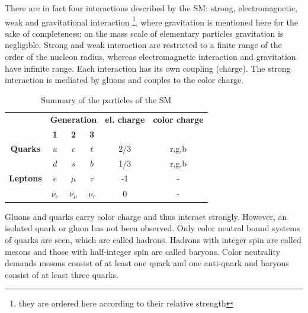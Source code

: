 There are in fact four interactions described by the SM: strong, electromagnetic, weak and gravitational interaction \footnote{they are ordered here according to their relative strength}, where gravitation is mentioned here for the sake of completeness; on the mass scale of elementary particles gravitation is negligible. Strong and weak interaction are restricted to a finite range of the order of the nucleon radius, whereas electromagnetic interaction and gravitation have infinite range. Each interaction has its own coupling (charge). The strong interaction is mediated by gluons and couples to the color charge.%
\begin{table}[htbp]
	\centering
	\begin{tabular}{cccccc}
		\toprule
		&\multicolumn{3}{c}{\textbf{Generation}}&\textbf{el. charge}&\textbf{color charge}\\
		&\textbf{1} & \textbf{2} & \textbf{3} & & \\
		\hline
		\textbf{Quarks} & $u$&$c$&$t$& 2/3 & r,g,b\\
		&$d$&$s$&$b$& 1/3 & r,g,b\\
		\textbf{Leptons}& $e$&$\mu$&$\tau$&-1& -\\
		& $\nu_e$&$\nu_\mu$&$\nu_\tau$&0&-\\
		\bottomrule

	\end{tabular}
\caption{Summary of the particles of the SM}
\label{tab:sm0}
\end{table}
%



Gluons and quarks carry color charge and thus interact strongly. However, an isolated quark or gluon has not been observed. Only color neutral bound systems of quarks are seen, which are called hadrons. Hadrons with integer spin are called mesons and those with half-integer spin are called baryons. Color neutrality demands mesons consist of at least one quark and one anti-quark and baryons consist of at least three quarks.


